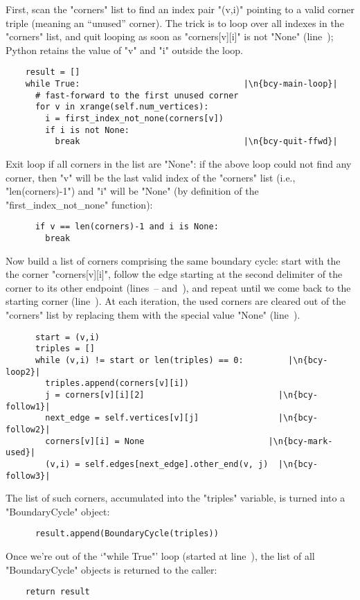First, scan the "corners" list to find an index pair "(v,i)" pointing
to a valid corner triple (meaning an ``unused'' corner). The trick is
to loop over all indexes in the "corners" list, and quit looping as
soon as "corners[v][i]" is not "None" (line~);
Python retains the value of "v" and "i" outside the loop.
\begin{lstlisting}
    result = []
    while True:                                 |\n{bcy-main-loop}|
      # fast-forward to the first unused corner
      for v in xrange(self.num_vertices):
        i = first_index_not_none(corners[v])
        if i is not None:
          break                                 |\n{bcy-quit-ffwd}|

\end{lstlisting}
Exit loop if all corners in the list are "None": if the above loop
could not find any corner, then "v" will be the last valid index of
the "corners" list (i.e., "len(corners)-1") and "i" will be "None" (by
definition of the "first_index_not_none" function):
\begin{lstlisting}
      if v == len(corners)-1 and i is None:
        break

\end{lstlisting}
Now build a list of corners comprising the same boundary cycle: start
with the the corner "corners[v][i]", follow the edge starting at the
second delimiter of the corner to its other endpoint
(lines~-- and~), and
repeat until we come back to the starting corner
(line~). At each iteration, the used corners are cleared
out of the "corners" list by replacing them with the special value
"None" (line~).
\begin{lstlisting}
      start = (v,i)
      triples = []
      while (v,i) != start or len(triples) == 0:         |\n{bcy-loop2}|
        triples.append(corners[v][i])
        j = corners[v][i][2]                           |\n{bcy-follow1}|
        next_edge = self.vertices[v][j]                |\n{bcy-follow2}|
        corners[v][i] = None                         |\n{bcy-mark-used}|
        (v,i) = self.edges[next_edge].other_end(v, j)  |\n{bcy-follow3}|
\end{lstlisting}
The list of such corners, accumulated into the "triples" variable, is
turned into a "BoundaryCycle" object:
\begin{lstlisting}
      result.append(BoundaryCycle(triples))

\end{lstlisting}
Once we're out of the `"while True"' loop (started at
line~), the list of all "BoundaryCycle" objects
is returned to the caller:
\begin{lstlisting}
    return result
    
\end{lstlisting}



